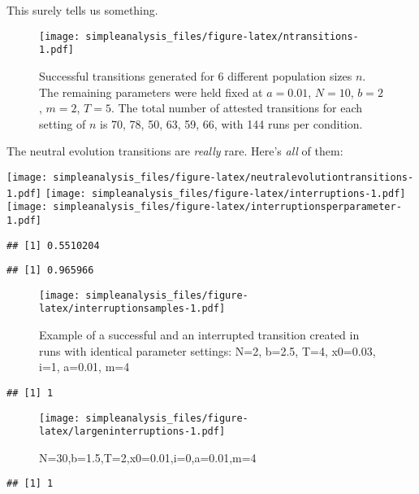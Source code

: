 \documentclass[a4paper]{article}
\begin{document}
This surely tells us something.

\begin{figure}[htbp]
\centering
\texttt{[image: simpleanalysis\_files/figure-latex/ntransitions-1.pdf]}
\caption{Successful transitions generated for 6 different population
sizes \(n\). The remaining parameters were held fixed at \(a=0.01\),
\(N=10\), \(b=2\), \(m=2\), \(T=5\). The total number of attested
transitions for each setting of \(n\) is 70, 78, 50, 63, 59, 66, with
144 runs per condition.}
\end{figure}

The neutral evolution transitions are \emph{really} rare. Here's
\emph{all} of them:

\texttt{[image: simpleanalysis\_files/figure-latex/neutralevolutiontransitions-1.pdf]}
\texttt{[image: simpleanalysis\_files/figure-latex/interruptions-1.pdf]}
\texttt{[image: simpleanalysis\_files/figure-latex/interruptionsperparameter-1.pdf]}

\begin{verbatim}
## [1] 0.5510204
\end{verbatim}

\begin{verbatim}
## [1] 0.965966
\end{verbatim}

\begin{figure}[htbp]
\centering
\texttt{[image: simpleanalysis\_files/figure-latex/interruptionsamples-1.pdf]}
\caption{Example of a successful and an interrupted transition created
in runs with identical parameter settings: N=2, b=2.5, T=4, x0=0.03,
i=1, a=0.01, m=4}
\end{figure}

\begin{verbatim}
## [1] 1
\end{verbatim}

\begin{figure}[htbp]
\centering
\texttt{[image: simpleanalysis\_files/figure-latex/largeninterruptions-1.pdf]}
\caption{N=30,b=1.5,T=2,x0=0.01,i=0,a=0.01,m=4}
\end{figure}

\begin{verbatim}
## [1] 1
\end{verbatim}
\end{document}
